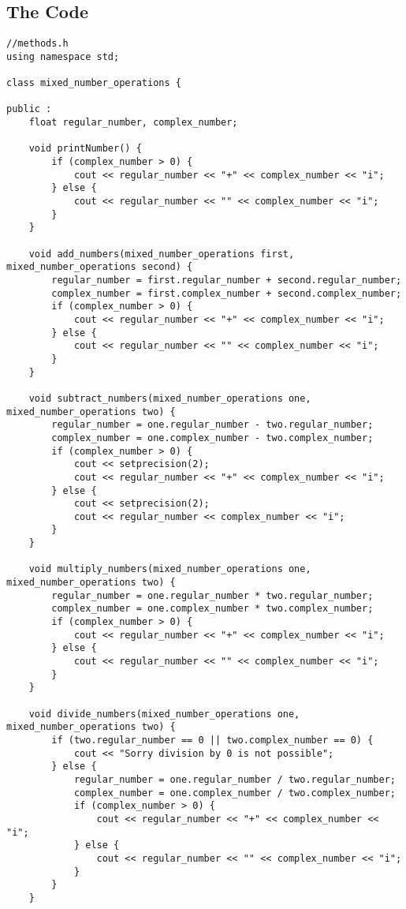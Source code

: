 \documentclass[11pt]{article}
\begin{document}
\subsection*{The Code}
\begin{lstlisting}
//methods.h
using namespace std;

class mixed_number_operations {

public :
    float regular_number, complex_number;

    void printNumber() {
        if (complex_number > 0) {
            cout << regular_number << "+" << complex_number << "i";
        } else {
            cout << regular_number << "" << complex_number << "i";
        }
    }

    void add_numbers(mixed_number_operations first, mixed_number_operations second) {
        regular_number = first.regular_number + second.regular_number;
        complex_number = first.complex_number + second.complex_number;
        if (complex_number > 0) {
            cout << regular_number << "+" << complex_number << "i";
        } else {
            cout << regular_number << "" << complex_number << "i";
        }
    }

    void subtract_numbers(mixed_number_operations one, mixed_number_operations two) {
        regular_number = one.regular_number - two.regular_number;
        complex_number = one.complex_number - two.complex_number;
        if (complex_number > 0) {
            cout << setprecision(2);
            cout << regular_number << "+" << complex_number << "i";
        } else {
            cout << setprecision(2);
            cout << regular_number << complex_number << "i";
        }
    }

    void multiply_numbers(mixed_number_operations one, mixed_number_operations two) {
        regular_number = one.regular_number * two.regular_number;
        complex_number = one.complex_number * two.complex_number;
        if (complex_number > 0) {
            cout << regular_number << "+" << complex_number << "i";
        } else {
            cout << regular_number << "" << complex_number << "i";
        }
    }

    void divide_numbers(mixed_number_operations one, mixed_number_operations two) {
        if (two.regular_number == 0 || two.complex_number == 0) {
            cout << "Sorry division by 0 is not possible";
        } else {
            regular_number = one.regular_number / two.regular_number;
            complex_number = one.complex_number / two.complex_number;
            if (complex_number > 0) {
                cout << regular_number << "+" << complex_number << "i";
            } else {
                cout << regular_number << "" << complex_number << "i";
            }
        }
    }


\end{lstlisting}
\end{document}
